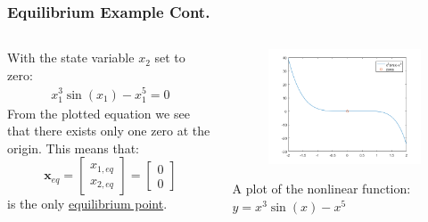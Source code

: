 \documentclass[11pt,handout]{beamer}   %
\begin{document}
\begin{frame}
\frametitle{Equilibrium Example Cont.}
\small
\begin{columns}
\begin{column}{0.5\textwidth}
With the state variable $x_2$ set to zero:
\begin{equation*}
\begin{aligned}
x_1^3 \sin(x_1) - x_1^5 = 0
\end{aligned}
\end{equation*}
From the plotted equation we see that there exists only one zero at the origin. This means that:
\begin{equation*}
\mathbf{x}_{eq} = \begin{bmatrix}
x_{1,eq}\\x_{2,eq}
\end{bmatrix} = \begin{bmatrix}
0\\0
\end{bmatrix}
\end{equation*}
is the only \underline{equilibrium point}.
\end{column}
\begin{column}{0.5\textwidth}
\begin{figure}
\centering
\includegraphics[width = \textwidth]{Figures/EqExample.png}
\end{figure}
A plot of the nonlinear function: $y = x^3\sin(x)-x^5$
\end{column}
\end{columns}
\end{frame}
\end{document}
